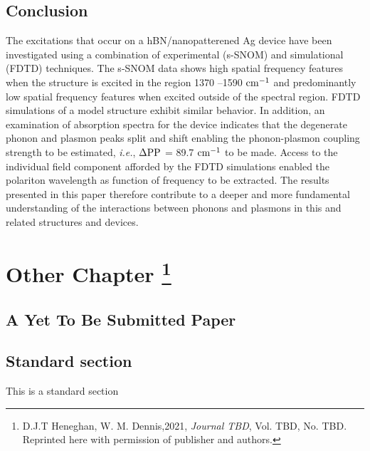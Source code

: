 \documentclass[12pt]{report}
\begin{document}
  \section{Conclusion}
  \label{sec:conclusion}
    The excitations that occur on a hBN/nanopatterened Ag device have been investigated using a combination of experimental (s-SNOM) and simulational (FDTD) techniques. The s-SNOM data shows high spatial frequency features when the structure is excited in the region 1370 –1590 $\rm cm^{-1}$  and predominantly low spatial frequency features when excited outside of the spectral region. FDTD simulations of a model structure exhibit similar behavior. In addition, an examination of absorption spectra for the device indicates that the degenerate phonon and plasmon peaks split and shift enabling the phonon-plasmon coupling strength to be estimated, \textit{i.e.}, $\Delta{\rm{PP}}$ = 89.7 $\rm cm^{-1}$  to be made. Access to the individual field component afforded by the FDTD simulations enabled the polariton wavelength as function of frequency to be extracted. The results presented in this paper therefore contribute to a deeper and more fundamental understanding of the interactions between phonons and plasmons in this and related structures and devices.
  




\chapter[Other Paper]
{Other Chapter%
  \footnote{D.J.T Heneghan, W. M. Dennis,2021, 
  \emph{Journal TBD}, Vol. TBD, No. TBD. \indent\indent Reprinted here with permission of publisher and authors.}}
\label{chapter:MHD}
\newpage

\section{A Yet To Be Submitted Paper}
\label{sec:intro3}



 \section{Standard section}
 
 This is a standard section
\end{document}

